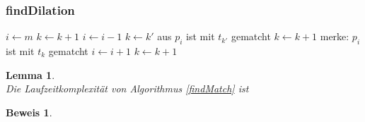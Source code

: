 \subsubsection {findDilation}


\begin{algorithm}
\DontPrintSemicolon
\caption{$\mathrm{findDilation} \colon M \times T \times \mathit{Bool} \rightarrow \mathit{Bool}$}\label{findDilation}
 {
    $i \leftarrow m$\;
    \Goto {\ref{dilationRematchLastNeedle}}\;
}
 {
}
 {
}
  { \label{dilationMatchCurrentNeedle}
     { 
         {
            \Goto {\ref{dilationPrepareNextNeedle}}\;
        }
        $k \leftarrow k + 1$\;
    }
}
  { \label{dilationRematchLastNeedle}
    $i \leftarrow i - 1$\;
    {$k \leftarrow k'$ aus \glqq $p_{i}$ ist mit $t_{k'}$ gematcht\grqq{}}\;
     {
        \Goto {\ref{dilationPrepareNextNeedle}}\;
    }
     {
        $k \leftarrow k + 1$\;
    \Goto {\ref{dilationMatchCurrentNeedle}}\;
    }
}
\;
 merke: $p_i$ ist mit $t_k$ gematcht\; \label{dilationPrepareNextNeedle}
$i \leftarrow i + 1$\;
$k \leftarrow k + 1$\;
 {
    \Goto {\ref{dilationMatchCurrentNeedle}}\;
}
 {
    \Goto {\ref{dilationRematchLastNeedle}}\;
}
\end{algorithm}



\newtheorem{lemKomplexitaetKomm}[bsp]{Lemma}
\begin{lemKomplexitaetKomm}\label{lemKomplexitaetKomm}~\\
Die Laufzeitkomplexität von Algorithmus \ref{findMatch} ist 
\end{lemKomplexitaetKomm}

\newtheorem{bewKomplexitaetKomm}[bsp]{Beweis}
\begin{bewKomplexitaetKomm}~\\
\end{bewKomplexitaetKomm}

